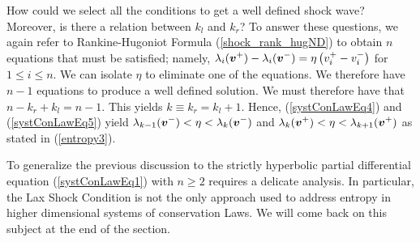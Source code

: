 How could we select all the conditions to get a well defined shock
wave?  Moreover, is there a relation between $k_l$ and $k_r$?
To answer these questions, we again refer to Rankine-Hugoniot Formula
(\ref{shock_rank_hugND}) to obtain $n$ equations that must be
satisfied; namely,
$\displaystyle \lambda_i({\bm{v}}^+)-\lambda_i({\bm{v}}^-)
= \eta \left(v_i^+ - v_i^- \right)$
for $1\leq i \leq n$.   We can isolate $\eta$ to eliminate one of
the equations.  We therefore have $n-1$ equations to produce a well
defined solution.  We must therefore have that
$n-k_r + k_l = n-1$.  This yields $k \equiv k_r = k_l + 1$.  Hence,
(\ref{systConLawEq4}) and (\ref{systConLawEq5}) yield
$\displaystyle
\lambda_{k-1}({\bm{v}}^-) < \eta < \lambda_k({\bm{v}}^-)$
and $\displaystyle
\lambda_k({\bm{v}}^+) < \eta < \lambda_{k+1}({\bm{v}}^+)$
as stated in (\ref{entropy3}).

To generalize the previous discussion to the strictly hyperbolic partial
differential equation (\ref{systConLawEq1}) with $n \geq 2$ requires a
delicate analysis.  In particular, the Lax Shock Condition is not the
only approach used to address entropy in higher dimensional systems 
of conservation Laws.  We will come back on this subject at the end of
the section.

